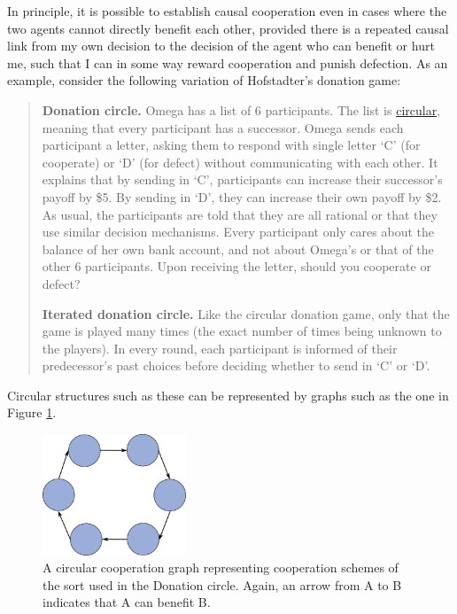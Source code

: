 In principle, it is possible to establish causal cooperation even in
cases where the two agents cannot directly benefit each other, provided
there is a repeated causal link from my own decision to the decision of
the agent who can benefit or hurt me, such that I can in some way reward
cooperation and punish defection. As an example, consider the following
variation of Hofstadter's donation game:

\begin{quote}
\textbf{Donation circle.} Omega has a list of 6 participants. The list
is
\href{https://en.wikipedia.org/wiki/Linked_list\#Circular_Linked_list}{circular},
meaning that every participant has a successor. Omega sends each
participant a letter, asking them to respond with single letter `C' (for
cooperate) or `D' (for defect) without communicating with each other. It
explains that by sending in `C', participants can increase their
successor's payoff by \$5. By sending in `D', they can increase their
own payoff by \$2. As usual, the participants are told that they are all
rational or that they use similar decision mechanisms. Every participant
only cares about the balance of her own bank account, and not about
Omega's or that of the other 6 participants. Upon receiving the letter,
should you cooperate or defect?

\textbf{Iterated donation circle.} Like the circular donation game, only
that the game is played many times (the exact number of times being
unknown to the players). In every round, each participant is informed of
their predecessor's past choices before deciding whether to send in `C'
or `D'.
\end{quote}

Circular structures such as these can be represented by graphs such as
the one in Figure \ref{circular-cooperation-graph}.

\begin{figure}
    \centering
    \includegraphics[width=1.68409in]{figs/circular-cooperation-graph}
    \caption{A circular cooperation graph
representing cooperation schemes of the sort used in the Donation
circle. Again, an arrow from A to B indicates that A can benefit B.}
    \label{circular-cooperation-graph}
\end{figure}

